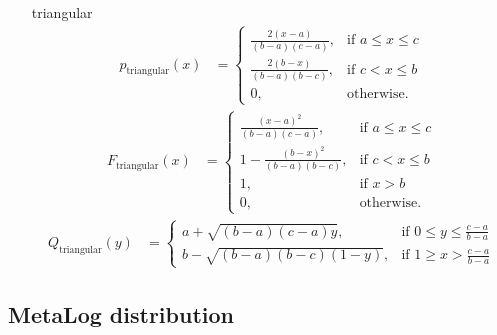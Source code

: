 \begin{itemize}
\item[triangular]
\begin{align}
p_\mathrm{triangular}(x) &= \begin{cases}
                           \frac{2(x-a)}{(b-a)(c-a)}, & \mbox{if } a\leq x \leq c \\
                           \frac{2(b-x)}{(b-a)(b-c)}, & \mbox{if } c <   x \leq b \\
                           0, & \mbox{otherwise}.
                         \end{cases}
\end{align}
\begin{align}
F_\mathrm{triangular}(x) &= \begin{cases}
                           \frac{(x-a)^2}{(b-a)(c-a)}, & \mbox{if } a\leq x \leq c \\
                           1-\frac{(b-x)^2}{(b-a)(b-c)}, & \mbox{if } c <   x \leq b \\
                           1, & \mbox{if } x > b \\
                           0, & \mbox{otherwise}.
                         \end{cases}
\end{align}
\begin{align}
Q_\mathrm{triangular}(y) &= \begin{cases}
                           a+\sqrt{(b-a)(c-a)y}, & \mbox{if } 0\leq y \leq \frac{c-a}{b-a} \\
                           b-\sqrt{(b-a)(b-c)(1-y)}, & \mbox{if } 1 \geq   x > \frac{c-a}{b-a}
                         \end{cases}
\end{align}
\end{itemize}

\subsection{MetaLog distribution} ~\\

